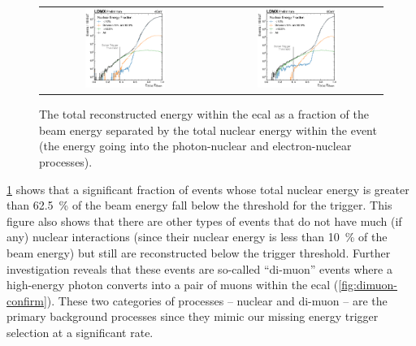 \begin{figure}
  \centering
  \begin{tabular}{cc}
    \includegraphics[width=0.49\textwidth]{figures/ldmx/simulation/4gev-ecal-by-nuc.pdf}
    &
    \includegraphics[width=0.49\textwidth]{figures/ldmx/simulation/8gev-ecal-by-nuc.pdf}
  \end{tabular}
  \caption{The total reconstructed energy within the \ac{ecal} as a fraction of the beam energy
  separated by the total nuclear energy within the event (the energy going into the photon-nuclear
  and electron-nuclear processes).}
  \label{fig:rec-efrac-by-nuc}
\end{figure}

\cref{fig:rec-efrac-by-nuc} shows that a significant fraction of events whose total nuclear
energy is greater than \qty{62.5}{\percent} of the beam energy fall below the threshold for
the trigger.
This figure also shows that there are other types of events that do not have much (if any)
nuclear interactions (since their nuclear energy is less than \qty{10}{\percent} of the beam
energy) but still are reconstructed below the trigger threshold.
Further investigation reveals that these events are so-called ``di-muon'' events where
a high-energy photon converts into a pair of muons within the \ac{ecal} (\cref{fig:dimuon-confirm}).
These two categories of processes -- nuclear and di-muon -- are the primary background
processes since they mimic our missing energy trigger selection at a significant rate.

